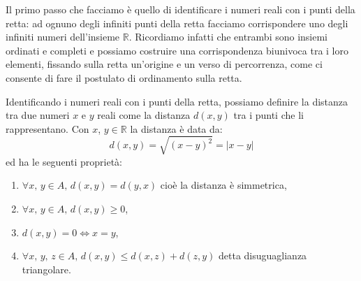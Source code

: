 Il primo passo che facciamo è quello di identificare i numeri reali con i 
punti della retta: ad ognuno degli infiniti punti della retta facciamo 
corrispondere uno degli infiniti numeri dell'insieme \(\mathbb{R}\). 
Ricordiamo infatti che entrambi sono insiemi ordinati e completi e possiamo 
costruire una corrispondenza biunivoca tra i loro elementi, fissando sulla 
retta un'origine e un verso di percorrenza, come ci consente di fare il 
postulato di ordinamento sulla retta.

Identificando i numeri reali con i punti della retta, possiamo definire la 
distanza tra due numeri \(x\) e \(y\) reali come la distanza \(d(x, y)\) tra 
i punti che li rappresentano. Con \(x\), \(y\in\mathbb{R}\) la distanza è 
data da:
\begin{equation}
  d(x,y)=\sqrt{(x-y)^2}=\vert x-y\vert
\end{equation}
ed ha le seguenti proprietà:
\begin{enumerate}
  \item \(\forall x,\,y \in A,\,d(x,y)=d(y,x)\) cioè la distanza è 
simmetrica,
  \item \(\forall x,\,y \in A,\,d(x,y)\geq0\),
  \item \(d(x,y)=0\Leftrightarrow x=y\),
  \item \(\forall x,\,y,\,z \in A,\,d(x,y)\leq d(x,z)+d(z,y)\) detta 
disuguaglianza triangolare.
\end{enumerate}

